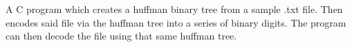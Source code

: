 \documentclass[]{rahulworld-resume}
\begin{document}
\begin{minipage}[t]{0.66\textwidth}
\noindent
\begin{minipage}{1\textwidth\vspace{0pt}}
A C program which creates a huffman binary tree from a sample .txt file. Then encodes said file via the huffman tree into a series of binary digits. The program can then decode the file using that same huffman tree.
\end{minipage}


\end{minipage} 
\end{document}
